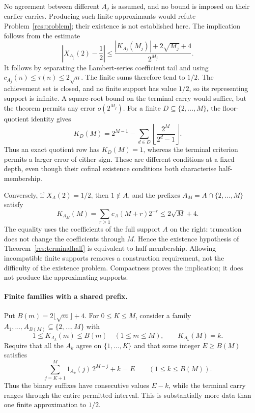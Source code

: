 \documentclass[11pt]{article}
\begin{document}
No agreement between different $A_j$ is assumed, and no bound is imposed
on their earlier carries.  Producing such finite approximants would
refute Problem~\ref{res:problem}; their existence is not established
here.  The implication follows from the estimate
\[
 \left|X_{A_j}(2)-\frac12\right|
 \le \frac{|K_{A_j}(M_j)|+2\sqrt{M_j}+4}{2^{M_j}}.
\]
It follows by separating the Lambert-series coefficient tail and using
$c_{A_j}(n)\le\tau(n)\le2\sqrt n$.  The finite sums therefore tend to
$1/2$.  The achievement set is closed, and no finite support has value
$1/2$, so its representing support is infinite.  A square-root bound on
the terminal carry would suffice, but the theorem permits any error
$o(2^{M_j})$.  For a finite $D\subseteq\{2,\ldots,M\}$, the
floor-quotient identity gives
\[
 K_D(M)=2^{M-1}-\sum_{d\in D}
                \left\lfloor\frac{2^M}{2^d-1}\right\rfloor.
\]
Thus an exact quotient row has $K_D(M)=1$, whereas the terminal
criterion permits a larger error of either sign.  These are different
conditions at a fixed depth, even though their cofinal existence
conditions both characterise half-membership.

Conversely, if $X_A(2)=1/2$, then $1\notin A$, and the prefixes
$A_M=A\cap\{2,\ldots,M\}$ satisfy
\[
 K_{A_M}(M)=\sum_{r\ge1}c_A(M+r)2^{-r}
       \le 2\sqrt M+4.
\]
The equality uses the coefficients of the full support $A$ on the
right: truncation does not change the coefficients through $M$.
Hence the existence hypothesis of Theorem~\ref{res:terminalhalf}
is equivalent to half-membership.  Allowing incompatible finite
supports removes a construction requirement, not the difficulty of
the existence problem.  Compactness proves the implication; it does
not produce the approximating supports.

\paragraph{Finite families with a shared prefix.}
Put $B(m)=2\lfloor\sqrt m\rfloor+4$.  For $0\le K\le M$, consider a
family $A_1,\ldots,A_{B(M)}\subseteq\{2,\ldots,M\}$ with
\[
 1\le K_{A_k}(m)\le B(m)\quad(1\le m\le M),
 \qquad K_{A_k}(M)=k.
\]
Require that all the $A_k$ agree on $\{1,\ldots,K\}$ and that some
integer $E\ge B(M)$ satisfies
\[
 \sum_{j=K+1}^{M}1_{A_k}(j)\,2^{M-j}+k=E
 \qquad(1\le k\le B(M)).
\]
Thus the binary suffixes have consecutive values $E-k$, while the
terminal carry ranges through the entire permitted interval.  This is
substantially more data than one finite approximation to $1/2$.
\end{document}
